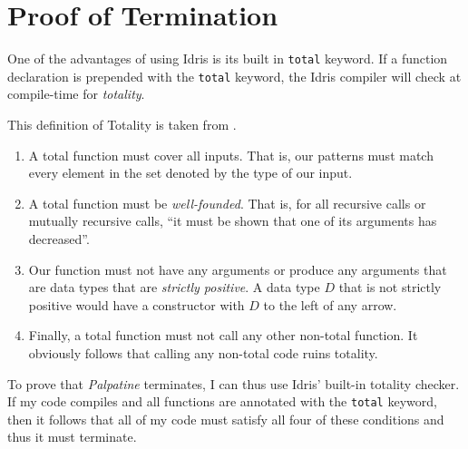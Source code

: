 \chapter{Proof of Termination}

One of the advantages of using Idris is its built in \texttt{total} keyword. If
a function declaration is prepended with the \texttt{total} keyword, the Idris
compiler will check at compile-time for \textit{totality}. 

This definition of Totality is taken from \cite{tdd_book}. 
\begin{enumerate}
    \item A total function must cover all inputs. That is, our patterns must
    match every element in the set denoted by the type of our input.
    \item A total function must be \textit{well-founded}. That is, for all
    recursive calls or mutually recursive calls, ``it must be shown that one of
    its arguments has decreased''. 
    \item Our function must not have any arguments or produce any arguments that
    are data types that are \textit{strictly positive}. A data type $D$ that is
    not strictly positive would have a constructor with $D$ to the left of any
    arrow. 
    \item Finally, a total function must not call any other non-total function.
    It obviously follows that calling any non-total code ruins totality. 
\end{enumerate}

To prove that \textit{Palpatine} terminates, I can thus use Idris' built-in
totality checker. If my code compiles and all functions are annotated with the
\texttt{total} keyword, then it follows that all of my code must satisfy all
four of these conditions and thus it must terminate. 